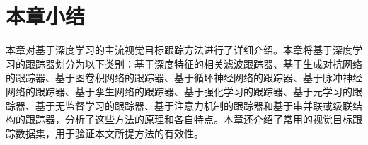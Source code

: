 \section{本章小结}
本章对基于深度学习的主流视觉目标跟踪方法进行了详细介绍。本章将基于深度学习的跟踪器划分为以下类别：基于深度特征的相关滤波跟踪器、基于生成对抗网络的跟踪器、基于图卷积网络的跟踪器、基于循环神经网络的跟踪器、基于脉冲神经网络的跟踪器、基于孪生网络的跟踪器、基于强化学习的跟踪器、基于元学习的跟踪器、基于无监督学习的跟踪器、基于注意力机制的跟踪器和基于串并联或级联结构的跟踪器，分析了这些方法的原理和各自特点。本章还介绍了常用的视觉目标跟踪数据集，用于验证本文所提方法的有效性。